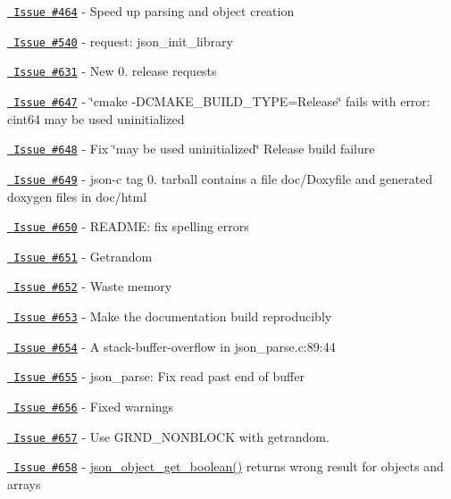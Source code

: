 \begin{DoxyItemize}
\item \href{https://github.com/json-c/json-c/issues/464}{\texttt{ Issue \#464}} -\/ Speed up parsing and object creation
\item \href{https://github.com/json-c/json-c/issues/540}{\texttt{ Issue \#540}} -\/ request\+: json\+\_\+init\+\_\+library
\item \href{https://github.com/json-c/json-c/issues/631}{\texttt{ Issue \#631}} -\/ New 0. release requests
\item \href{https://github.com/json-c/json-c/issues/647}{\texttt{ Issue \#647}} -\/ \char`\"{}cmake -\/\+DCMAKE\+\_\+\+BUILD\+\_\+\+TYPE=\+Release\char`\"{} fails with error\+: \textquotesingle{}cint64\textquotesingle{} may be used uninitialized
\item \href{https://github.com/json-c/json-c/issues/648}{\texttt{ Issue \#648}} -\/ Fix \char`\"{}may be used uninitialized\char`\"{} Release build failure
\item \href{https://github.com/json-c/json-c/issues/649}{\texttt{ Issue \#649}} -\/ json-\/c tag 0. tarball contains a file doc/\+Doxyfile and generated doxygen files in doc/html
\item \href{https://github.com/json-c/json-c/issues/650}{\texttt{ Issue \#650}} -\/ README\+: fix spelling errors
\item \href{https://github.com/json-c/json-c/issues/651}{\texttt{ Issue \#651}} -\/ Getrandom
\item \href{https://github.com/json-c/json-c/issues/652}{\texttt{ Issue \#652}} -\/ Waste memory
\item \href{https://github.com/json-c/json-c/issues/653}{\texttt{ Issue \#653}} -\/ Make the documentation build reproducibly
\item \href{https://github.com/json-c/json-c/issues/654}{\texttt{ Issue \#654}} -\/ A stack-\/buffer-\/overflow in json\+\_\+parse.\+c\+:89\+:44
\item \href{https://github.com/json-c/json-c/issues/655}{\texttt{ Issue \#655}} -\/ json\+\_\+parse\+: Fix read past end of buffer
\item \href{https://github.com/json-c/json-c/issues/656}{\texttt{ Issue \#656}} -\/ Fixed warnings
\item \href{https://github.com/json-c/json-c/issues/657}{\texttt{ Issue \#657}} -\/ Use GRND\+\_\+\+NONBLOCK with getrandom.
\item \href{https://github.com/json-c/json-c/issues/658}{\texttt{ Issue \#658}} -\/ \mbox{\hyperlink{json__object_8h_ac003fb99db7ecd674bb16d983d2f92ee}{json\+\_\+object\+\_\+get\+\_\+boolean()}} returns wrong result for objects and arrays

\end{DoxyItemize}
